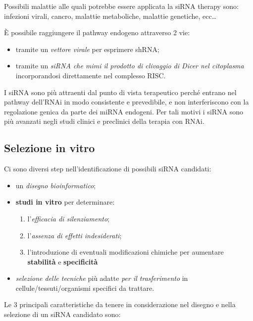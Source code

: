 \documentclass[11pt]{book}
\begin{document}
Possibili malattie alle quali potrebbe essere applicata la siRNA therapy
sono: infezioni virali, cancro, malattie metaboliche, malattie
genetiche, ecc\ldots{}

È possibile raggiungere il pathway endogeno attraverso 2 vie:

\begin{itemize}
\itemsep1pt\parskip0pt
\item
  tramite un \emph{vettore virale} per esprimere shRNA;
\item
  tramite un \emph{siRNA che mimi il prodotto di clivaggio di Dicer nel
  citoplasma} incorporandosi direttamente nel complesso RISC.
\end{itemize}

I siRNA sono più attraenti dal punto di vista terapeutico perché entrano
nel pathway dell'RNAi in modo consistente e prevedibile, e non
interferiscono con la regolazione genica da parte dei miRNA endogeni.
Per tali motivi i siRNA sono più avanzati negli studi clinici e
preclinici della terapia con RNAi.

\subsection{Selezione in vitro}\label{selezione-in-vitro}

Ci sono diversi step nell'identificazione di possibili siRNA candidati:

\begin{itemize}
\itemsep1pt\parskip0pt
\item
  un \emph{disegno bioinformatico};
\item
  \textbf{studi in vitro} per determinare:

  \begin{enumerate}
  \def\labelenumi{\arabic{enumi}.}
  \itemsep1pt\parskip0pt
  \item
    l'\emph{efficacia di silenziamento};
  \item
    l'\emph{assenza di effetti indesiderati};
  \item
    l'introduzione di eventuali modificazioni chimiche per aumentare
    \textbf{stabilità} e \textbf{specificità}
  \end{enumerate}
\item
  \emph{selezione delle tecniche} più adatte \emph{per il trasferimento}
  in cellule/tessuti/organismi specifici da trattare.
\end{itemize}

Le 3 principali caratteristiche da tenere in considerazione nel disegno e
nella selezione di un siRNA candidato sono:
\end{document}
